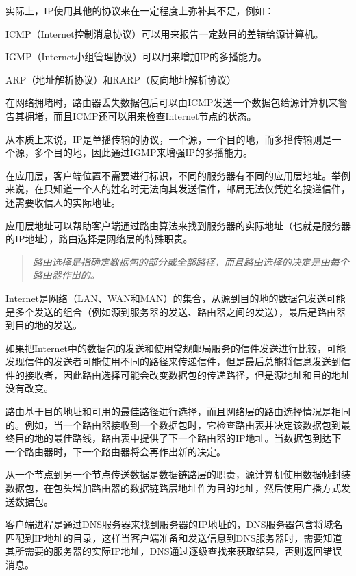 实际上，IP使用其他的协议来在一定程度上弥补其不足，例如：

\begin{compactitem}
\item ICMP（Internet控制消息协议）可以用来报告一定数目的差错给源计算机。
\item IGMP（Internet小组管理协议）可以用来增加IP的多播能力。
\item ARP（地址解析协议）和RARP（反向地址解析协议）
\end{compactitem}

在网络拥堵时，路由器丢失数据包后可以由ICMP发送一个数据包给源计算机来警告其拥堵，而且ICMP还可以用来检查Internet节点的状态。

从本质上来说，IP是单播传输的协议，一个源，一个目的地，而多播传输则是一个源，多个目的地，因此通过IGMP来增强IP的多播能力。

在应用层，客户端位置不需要进行标识，不同的服务器有不同的应用层地址。举例来说，在只知道一个人的姓名时无法向其发送信件，邮局无法仅凭姓名投递信件，还需要收信人的实际地址。

应用层地址可以帮助客户端通过路由算法来找到服务器的实际地址（也就是服务器的IP地址），路由选择是网络层的特殊职责。

\begin{quote}
\textsl{路由选择是指确定数据包的部分或全部路径，而且路由选择的决定是由每个路由器作出的。}
\end{quote}

Internet是网络（LAN、WAN和MAN）的集合，从源到目的地的数据包发送可能是多个发送的组合（例如源到服务器的发送、路由器之间的发送），最后是路由器到目的地的发送。

如果把Internet中的数据包的发送和使用常规邮局服务的信件发送进行比较，可能发现信件的发送者可能使用不同的路径来传递信件，但是最后总能将信息发送到信件的接收者，因此路由选择可能会改变数据包的传递路径，但是源地址和目的地址没有改变。

路由基于目的地址和可用的最佳路径进行选择，而且网络层的路由选择情况是相同的。例如，当一个路由器接收到一个数据包时，它检查路由表并决定该数据包到最终目的地的最佳路线，路由表中提供了下一个路由器的IP地址。当数据包到达下一个路由器时，下一个路由器将会再作出新的决定。

从一个节点到另一个节点传送数据是数据链路层的职责，源计算机使用数据帧封装数据包，在包头增加路由器的数据链路层地址作为目的地址，然后使用广播方式发送数据包。

客户端进程是通过DNS服务器来找到服务器的IP地址的，DNS服务器包含将域名匹配到IP地址的目录，这样当客户端准备和发送信息到DNS服务器时，需要知道其所需要的服务器的实际IP地址，DNS通过逐级查找来获取结果，否则返回错误消息。

